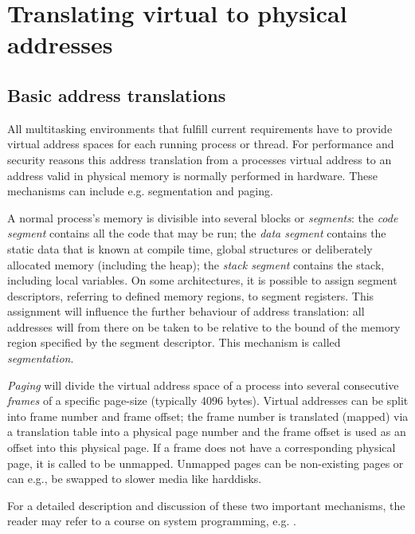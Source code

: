 %
%

\section{Translating virtual to physical addresses}

\label{addresstranslations}

\subsection{Basic address translations}

\label{address_translation} All multitasking environments that fulfill current
requirements have to provide virtual address spaces for each running process or
thread. For performance and security reasons this address translation from a
processes virtual address to an address valid in physical memory is normally
performed in hardware.  These mechanisms can include e.g. segmentation and
paging.

A normal process's memory is divisible into several blocks or \emph{segments}:
the \emph{code segment} contains all the code that may be run; the \emph{data
segment} contains the static data that is known at compile time, global
structures or deliberately allocated memory (including the heap); the
\emph{stack segment} contains the stack, including local variables.  On some
architectures, it is possible to assign segment descriptors, referring to
defined memory regions, to segment registers.  This assignment will influence
the further behaviour of address translation: all addresses will from there on
be taken to be relative to the bound of the memory region specified by the
segment descriptor. This mechanism is called \emph{segmentation}.

\emph{Paging} will divide the virtual address space of a process into several
consecutive \emph{frames} of a specific page-size (typically 4096 bytes).
Virtual addresses can be split into frame number and frame offset; the frame
number is translated (mapped) via a translation table into a physical page
number and the frame offset is used as an offset into this physical page. If a
frame does not have a corresponding physical page, it is called to be unmapped.
Unmapped pages can be non-existing pages or can e.g., be swapped to slower media
like harddisks.

For a detailed description and discussion of these two important mechanisms, the
reader may refer to a course on system programming, e.g.
\cite{rwth_syspro_scriptum:2002}.

